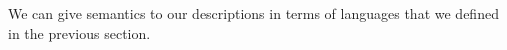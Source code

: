 We can give semantics to our descriptions in terms of languages that we defined in the previous section.

\begin{code}%
%
\>[4]\AgdaSpace{}%
\AgdaSymbol{:}\AgdaSpace{}%
\AgdaSpace{}%
\AgdaSpace{}%
\AgdaSpace{}%
\AgdaSpace{}%
\<%
\\
%
\>[4]\AgdaSpace{}%
\AgdaSpace{}%
%
\>[22]\AgdaSymbol{\AgdaUnderscore{}}\AgdaSpace{}%
\AgdaSymbol{=}\AgdaSpace{}%
\<%
\\
%
\>[4]\AgdaSpace{}%
\AgdaSpace{}%
%
\>[22]\AgdaSymbol{\AgdaUnderscore{}}\AgdaSpace{}%
\AgdaSymbol{=}\AgdaSpace{}%
\<%
\\
%
\>[4]\AgdaSpace{}%
\AgdaSpace{}%
\AgdaSpace{}%
%
\>[22]\AgdaSymbol{\AgdaUnderscore{}}\AgdaSpace{}%
\AgdaSymbol{=}\AgdaSpace{}%
\AgdaSpace{}%
\<%
\\
%
\>[4]\AgdaSpace{}%
\AgdaSpace{}%
\AgdaSpace{}%
\AgdaSpace{}%
%
\>[22]\AgdaSpace{}%
\AgdaSymbol{=}\AgdaSpace{}%
\AgdaSpace{}%
\AgdaSpace{}%
\AgdaSpace{}%
\AgdaSpace{}%
\AgdaSpace{}%
\AgdaSpace{}%
\AgdaSpace{}%
\AgdaSpace{}%
\<%
\\
%
\>[4]\AgdaSpace{}%
\AgdaSpace{}%
\AgdaSpace{}%
\AgdaSpace{}%
%
\>[22]\AgdaSpace{}%
\AgdaSymbol{=}\AgdaSpace{}%
\AgdaSpace{}%
\AgdaSpace{}%
\AgdaSpace{}%
\AgdaSpace{}%
\AgdaSpace{}%
\AgdaSpace{}%
\AgdaSpace{}%
\AgdaSpace{}%

\end{code}

